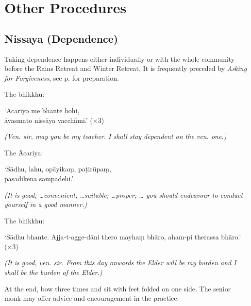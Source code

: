 \chapter{Other Procedures}

\section{Nissaya (Dependence)}
\label{nissaya}

Taking dependence happens either individually or with the whole community before
the Rains Retreat and Winter Retreat. It is frequently preceded by \emph{Asking
  for Forgiveness}, see p.\pageref{asking-forgiveness} for preparation.

The bhikkhu:

\vspace*{\parskip}

\begin{paritta}
  ‘Ācariyo me bhante hohi,\\
  āyasmato nissāya vacchāmi.’ (×3)
\end{paritta}

\emph{(Ven. sir, may you be my teacher. I shall stay dependent on the ven. one.)}

The Ācariya:

\vspace*{\parskip}

\begin{paritta}
  ‘Sādhu, lahu, opāyikaṃ, paṭirūpaṃ,\\
  pāsādikena sampādehi.’
\end{paritta}

\emph{(It is good; …convenient; …suitable; …proper; … you should endeavour to
  conduct yourself in a good manner.)} 

The bhikkhu:

\vspace*{\parskip}

\begin{paritta}
  ‘Sādhu bhante. Ajja-t-agge-dāni thero mayhaṃ bhāro, aham-pi therassa bhāro.’ (×3)
\end{paritta}

\emph{(It is good, ven. sir. From this day onwards the Elder will be my burden
  and I shall be the burden of the Elder.)} 

At the end, bow three times and sit with feet folded on one side. The senior
monk may offer advice and encouragement in the practice.

